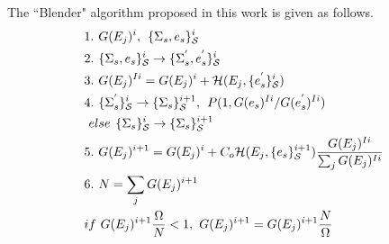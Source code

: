 \documentclass[twocolumn]{article}
\begin{document}
The ``Blender" algorithm proposed in this work  is given as follows. \\
\begin{equation}
\begin{split}
&1.\hspace{0.125cm} G(E_j)^i ,\hspace{0.15cm}  \{\Sigma_{s},e_s\}_{\mathcal{S}}^i\\
&2. \hspace{0.125cm}\{\Sigma_{s},e_s\}_{\mathcal{S}}^i \rightarrow  \{\Sigma_{s}^{'},e_s^{'}\}_{\mathcal{S}}^i\\
&3. \hspace{0.125cm}G(E_j)^{Ii} = G(E_j)^i + \mathcal{H}(E_j, \{e_{s}^{'}\}_{\mathcal{S}}^i) \\
&4. \hspace{0.125cm}\{\Sigma_{s}^{'}\}_{\mathcal{S}}^i \rightarrow \{\Sigma_{s}\}_{\mathcal{S}}^{i+1}, \hspace{0.15cm} P(1, G(e_s)^{Ii}/G(e_s^{'})^{Ii})\\
& \hspace{0.125cm}else  \hspace{0.15cm} \{\Sigma_{s}\}_{\mathcal{S}}^i \rightarrow \{\Sigma_{s}\}_{\mathcal{S}}^{i+1}\\
&5. \hspace{0.125cm} G(E_j)^{i+1} = G(E_j)^{i} + C_o\mathcal{H}(E_j, \{e_s\}_{\mathcal{S}}^{i+1})\frac{G(E_j)^{Ii}}{\sum_j G(E_j)^{Ii} }\\
&6. \hspace{0.125cm} N = \sum_j G(E_j)^{i+1} \hspace{0.125cm}\\
& if \hspace{0.125cm} G(E_j)^{i+1}\frac{\Omega}{N}  < 1, \hspace{0.125cm}  G(E_j)^{i+1} = G(E_j)^{i+1} \frac{N}{\Omega}
\end{split}
\end{equation}
\end{document}
